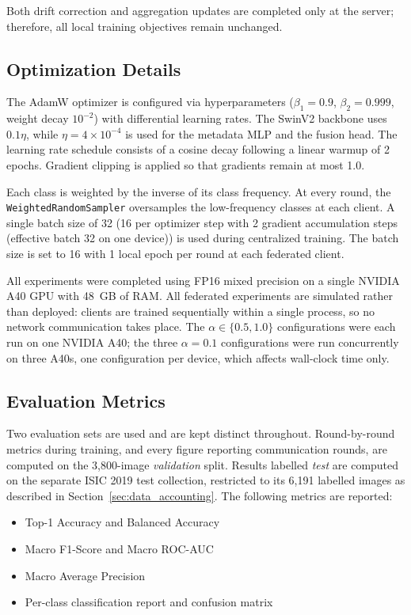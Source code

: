 \documentclass{ieeeaccess}
\begin{document}
Both drift correction and aggregation updates are completed only at the server; therefore, all local training objectives remain unchanged.

\subsection{Optimization Details}

The AdamW optimizer is configured via hyperparameters ($\beta_1=0.9$, $\beta_2=0.999$, weight decay $10^{-2}$) with differential learning rates. The SwinV2 backbone uses $0.1\eta$, while $\eta = 4 \times 10^{-4}$ is used for the metadata MLP and the fusion head. The learning rate schedule consists of a cosine decay following a linear warmup of 2 epochs. Gradient clipping is applied so that gradients remain at most 1.0.

Each class is weighted by the inverse of its class frequency. At every round, the \texttt{WeightedRandomSampler} oversamples the low-frequency classes at each client. A single batch size of 32 (16 per optimizer step with 2 gradient accumulation steps (effective batch 32 on one device)) is used during centralized training. The batch size is set to 16 with 1 local epoch per round at each federated client.

All experiments were completed using FP16 mixed precision on a single NVIDIA A40 GPU with 48~GB of RAM. All federated experiments are simulated rather than deployed: clients are trained sequentially within a single process, so no network communication takes place. The $\alpha \in \{0.5, 1.0\}$ configurations were each run on one NVIDIA A40; the three $\alpha{=}0.1$ configurations were run concurrently on three A40s, one configuration per device, which affects wall-clock time only.

\subsection{Evaluation Metrics}

Two evaluation sets are used and are kept distinct throughout. Round-by-round metrics during training, and every figure reporting communication rounds, are computed on the 3,800-image \emph{validation} split. Results labelled \emph{test} are computed on the separate ISIC 2019 test collection, restricted to its 6,191 labelled images as described in Section~\ref{sec:data_accounting}. The following metrics are reported:
\begin{itemize}
    \item Top-1 Accuracy and Balanced Accuracy
    \item Macro F1-Score and Macro ROC-AUC
    \item Macro Average Precision
    \item Per-class classification report and confusion matrix
\end{itemize}
\end{document}

